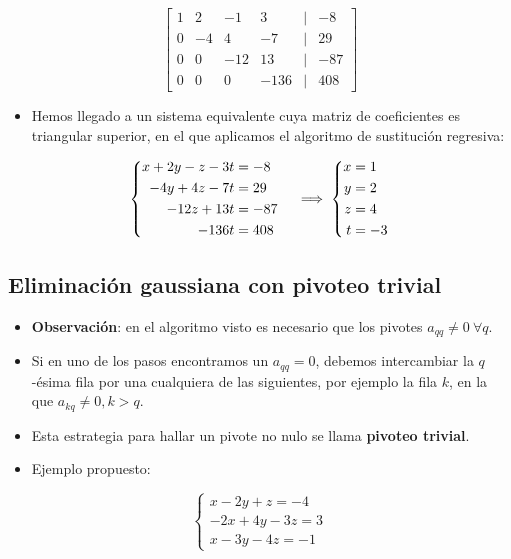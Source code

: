 \documentclass[]{book}
\providecommand{\tightlist}{%
  \setlength{\itemsep}{0pt}\setlength{\parskip}{0pt}}
\begin{document}
\[
\begin{bmatrix}
1 & 2 & -1 & 3 &|& -8\\
0 & -4 & 4 & -7 &|& 29\\
0 & 0 & -12 & 13 &|& -87\\
0 & 0 & 0 & -136 &|& 408  
\end{bmatrix}
\]

\begin{itemize}
\tightlist
\item
  Hemos llegado a un sistema equivalente cuya matriz de coeficientes es triangular superior, en el que aplicamos el algoritmo de sustitución regresiva:
\end{itemize}

\[
\left\{
\begin{aligned}
x+2y-z-3t &=-8 \cr
-4y+4z-7t &=29\cr
-12z+13t &=-87\cr
-136t &=408
\end{aligned}
\right.
\implies
\left\{
\begin{aligned}
x &= 1\\ y &= 2\\ z &= 4\\ t &= -3
\end{aligned}
\right.
\]

\hypertarget{eliminaciuxf3n-gaussiana-con-pivoteo-trivial}{%
\subsection{Eliminación gaussiana con pivoteo trivial}\label{eliminaciuxf3n-gaussiana-con-pivoteo-trivial}}

\begin{itemize}
\tightlist
\item
  \textbf{Observación}: en el algoritmo visto es necesario que los pivotes \(a_{qq} \neq 0 ~\forall q\).
\item
  Si en uno de los pasos encontramos un \(a_{qq} = 0\), debemos intercambiar la \(q\)-ésima fila por una cualquiera de las siguientes, por ejemplo la fila \(k\), en la que \(a_{kq} \neq 0, k>q\).
\item
  Esta estrategia para hallar un pivote no nulo se llama \textbf{pivoteo trivial}.
\item
  Ejemplo propuesto:
\end{itemize}

\[
\begin{cases} 
x-2y+z=-4 \\
-2x+4y-3z=3 \\
x-3y-4z=-1
\end{cases}
\]
\end{document}
